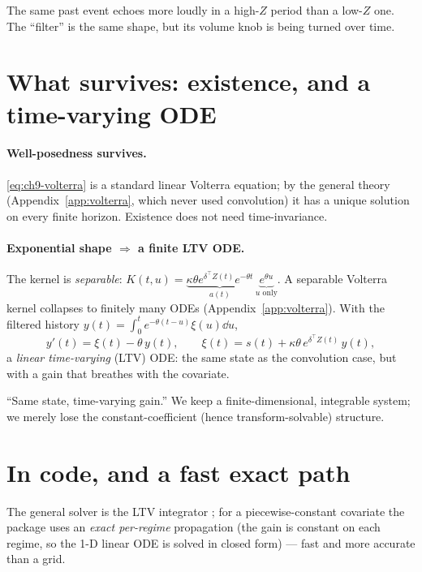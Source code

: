 \begin{intuitionbox}
The same past event echoes more loudly in a high-$Z$ period than a low-$Z$ one. The
``filter'' is the same shape, but its volume knob is being turned over time.
\end{intuitionbox}

\section{What survives: existence, and a time-varying ODE}

\paragraph{Well-posedness survives.} \eqref{eq:ch9-volterra} is a standard linear
Volterra equation; by the general theory (Appendix~\ref{app:volterra}, which never
used convolution) it has a unique solution on every finite horizon. Existence does
not need time-invariance.

\paragraph{Exponential shape $\Rightarrow$ a finite LTV ODE.} The kernel is
\emph{separable}: $K(t,u)=\underbrace{\kappa\theta e^{\delta^\top Z(t)}e^{-\theta t}}_{a(t)}\,\underbrace{e^{\theta u}}_{u\text{ only}}$.
A separable Volterra kernel collapses to finitely many ODEs
(Appendix~\ref{app:volterra}). With the filtered history
$y(t)=\int_0^t e^{-\theta(t-u)}\xi(u)\dd u$,
\begin{equation}
y'(t)=\xi(t)-\theta\,y(t),\qquad
\xi(t)=s(t)+\kappa\theta\,e^{\delta^\top Z(t)}\,y(t),
\label{eq:ch9-ltv}
\end{equation}
a \emph{linear time-varying} (LTV) ODE: the same state as the convolution case, but
with a gain that breathes with the covariate.

\begin{intuitionbox}
``Same state, time-varying gain.'' We keep a finite-dimensional, integrable system;
we merely lose the constant-coefficient (hence transform-solvable) structure.
\end{intuitionbox}

\section{In code, and a fast exact path}

The general solver is the LTV integrator ; for a
piecewise-constant covariate the package uses an \emph{exact per-regime}
propagation (the gain is constant on each regime, so the 1-D linear ODE is solved
in closed form) --- fast and more accurate than a grid.

